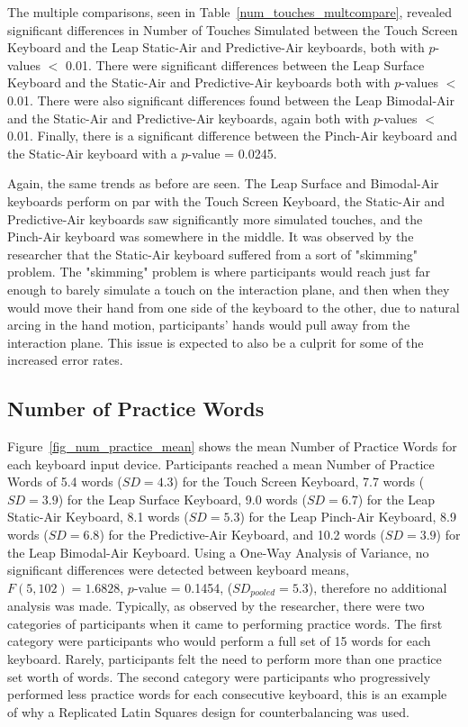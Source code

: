 The multiple comparisons, seen in Table~\ref{num_touches_multcompare}, revealed significant differences in Number of Touches Simulated between the Touch Screen Keyboard and the Leap Static-Air and Predictive-Air keyboards, both with $p$-values $<$ 0.01. There were significant differences between the Leap Surface Keyboard and the Static-Air and Predictive-Air keyboards both with $p$-values $<$ 0.01. There were also significant differences found between the Leap Bimodal-Air and the Static-Air and Predictive-Air keyboards, again both with $p$-values $<$ 0.01. Finally, there is a significant difference between the Pinch-Air keyboard and the Static-Air keyboard with a $p$-value = 0.0245.

Again, the same trends as before are seen. The Leap Surface and Bimodal-Air keyboards perform on par with the Touch Screen Keyboard, the Static-Air and Predictive-Air keyboards saw significantly more simulated touches, and the Pinch-Air keyboard was somewhere in the middle. It was observed by the researcher that the Static-Air keyboard suffered from a sort of "skimming" problem. The "skimming" problem is where participants would reach just far enough to barely simulate a touch on the interaction plane, and then when they would move their hand from one side of the keyboard to the other, due to natural arcing in the hand motion, participants' hands would pull away from the interaction plane. This issue is expected to also be a culprit for some of the increased error rates.

\subsection{Number of Practice Words}
Figure~\ref{fig_num_practice_mean} shows the mean Number of Practice Words for each keyboard input device. Participants reached a mean Number of Practice Words of 5.4 words ($SD = 4.3$) for the Touch Screen Keyboard, 7.7 words ($SD = 3.9$) for the Leap Surface Keyboard, 9.0 words ($SD = 6.7$) for the Leap Static-Air Keyboard, 8.1 words ($SD = 5.3$) for the Leap Pinch-Air Keyboard, 8.9 words ($SD = 6.8$) for the Predictive-Air Keyboard, and 10.2 words ($SD = 3.9$) for the Leap Bimodal-Air Keyboard. Using a One-Way Analysis of Variance, no significant differences were detected between keyboard means, $F(5, 102) = 1.6828$, $p$-value = 0.1454, ($SD_{pooled} = 5.3$), therefore no additional analysis was made. Typically, as observed by the researcher, there were two categories of participants when it came to performing practice words. The first category were participants who would perform a full set of 15 words for each keyboard. Rarely, participants felt the need to perform more than one practice set worth of words. The second category were participants who progressively performed less practice words for each consecutive keyboard, this is an example of why a Replicated Latin Squares design for counterbalancing was used.

